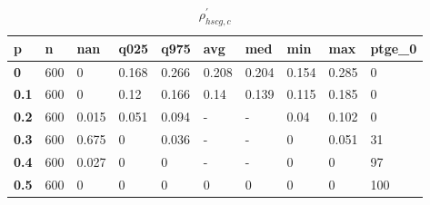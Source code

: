 \begin{table}[h]
 \centering 
\footnotesize
\caption{$\rho_{hscg,c}^\prime $}
\label{tab:alphahscgc}
\begin{tabular}[h]{|l|l|l|l|l|l|l|l|l|l|
    } \hline
\textbf{ p} & \textbf{ n} & \textbf{ nan} & \textbf{ q025} & \textbf{ q975} & \textbf{ avg} & \textbf{ med} & \textbf{ min} & \textbf{ max} & \textbf{ ptge\_0}
    \\ \hline
  \textbf{  0} & 600 &     0 & 0.168 & 0.266 & 0.208 & 0.204 & 0.154 & 0.285 &   0
    \\ \hline
  \textbf{0.1} & 600 &     0 &  0.12 & 0.166 &  0.14 & 0.139 & 0.115 & 0.185 &   0
    \\ \hline
  \textbf{0.2} & 600 & 0.015 & 0.051 & 0.094 & - & - &  0.04 & 0.102 &   0
    \\ \hline
  \textbf{0.3} & 600 & 0.675 &     0 & 0.036 & - & - &     0 & 0.051 &  31
    \\ \hline
  \textbf{0.4} & 600 & 0.027 &     0 &     0 & - & - &     0 &     0 &  97
    \\ \hline
  \textbf{0.5} & 600 &     0 &     0 &     0 &     0 &     0 &     0 &     0 & 100
    \\ \hline
 \end{tabular}
 \end{table}
